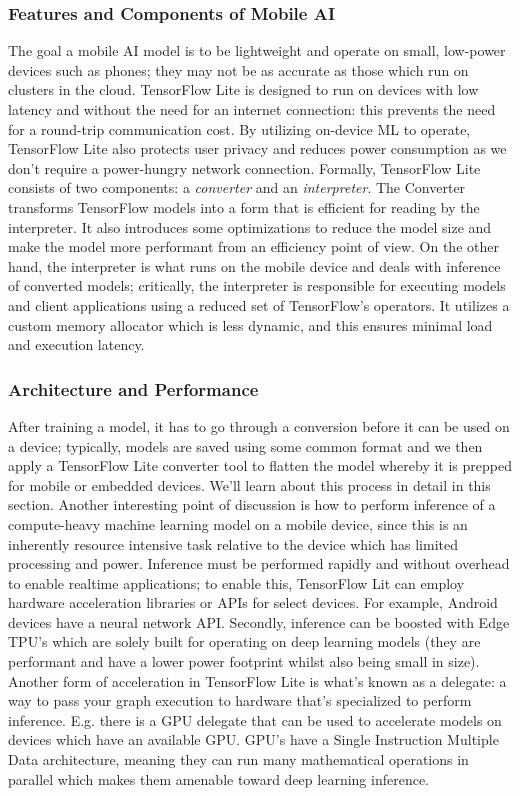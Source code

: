 \documentclass[12pt]{article}
\begin{document}
\subsubsection{Features and Components of Mobile AI}
The goal a mobile AI model is to be lightweight and operate on small, low-power devices such as phones; they
may not be as accurate as those which run on clusters in the cloud. TensorFlow Lite is designed to run on devices with
low latency and without the need for an internet connection: this prevents the need for a round-trip communication
cost. By utilizing on-device ML to operate, TensorFlow Lite also protects user privacy and reduces power consumption
as we don't require a power-hungry network connection. Formally, TensorFlow Lite consists of two components: a \emph{converter}
and an \emph{interpreter}. The Converter transforms TensorFlow models into a form that is efficient for reading by the interpreter.
It also introduces some optimizations to reduce the model size and make the model more performant from an efficiency point of view.
On the other hand, the interpreter is what runs on the mobile device and deals with inference of converted models; critically,
the interpreter is responsible for executing models and client applications
using a reduced set of TensorFlow's operators. It utilizes a custom memory allocator which is less dynamic, and this
ensures minimal load and execution latency.

\subsubsection{Architecture and Performance}
After training a model, it has to go through a conversion before it can
be used on a device; typically, models are saved using some common format and we then apply a TensorFlow Lite converter
tool to flatten the model whereby it is prepped for mobile or embedded devices. We'll learn about this process in detail
in this section. Another interesting point of discussion is how to perform inference of a compute-heavy machine learning model
on a mobile device, since this is an inherently resource intensive task relative to the device which has limited processing
and power. Inference must be performed rapidly and without overhead to enable realtime applications; to enable this, TensorFlow Lit
can employ hardware acceleration libraries or APIs for select devices. For example, Android devices have a neural network API.
Secondly, inference can be boosted with Edge TPU's which are solely built for operating on deep learning models (they are performant
and have a lower power footprint whilst also being small in size). Another form of acceleration in TensorFlow Lite is
what's known as a delegate: a way to pass your graph execution to hardware that's specialized to perform inference. E.g.
there is a GPU delegate that can be used to accelerate models on devices which have an available GPU. GPU's have a
Single Instruction Multiple Data architecture, meaning they can run many mathematical operations in parallel which makes them
amenable toward deep learning inference.
\end{document}
